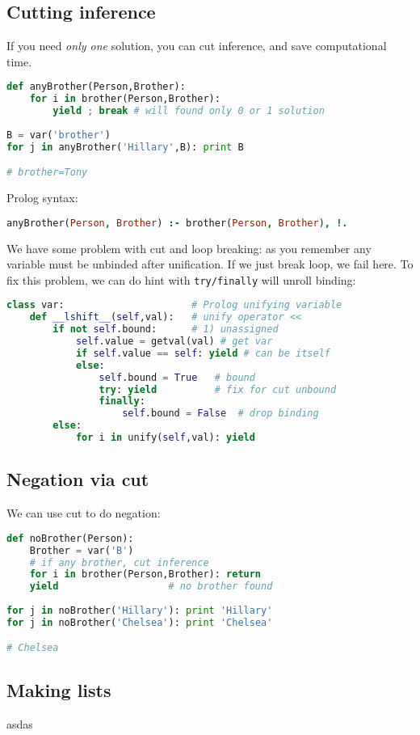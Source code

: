 \subsection{Cutting inference}

If you need \emph{only one} solution, you can cut inference, and save
computational time.

\begin{lstlisting}[language=Python]
def anyBrother(Person,Brother):
	for i in brother(Person,Brother):
		yield ; break # will found only 0 or 1 solution
	
B = var('brother')
for j in anyBrother('Hillary',B): print B

# brother=Tony
\end{lstlisting}
Prolog syntax:
\begin{lstlisting}[language=Prolog]
anyBrother(Person, Brother) :- brother(Person, Brother), !.
\end{lstlisting}

We have some problem with cut and loop breaking: as you remember any variable
must be unbinded after unification. If we just break loop, we fail here. To fix
this problem, we can do hint with \verb|try/finally| will unroll binding:
\begin{lstlisting}[language=Python]
class var:						# Prolog unifying variable
	def __lshift__(self,val):   # unify operator <<
		if not self.bound:		# 1) unassigned
			self.value = getval(val) # get var
			if self.value == self: yield # can be itself
			else:
				self.bound = True	# bound
				try: yield			# fix for cut unbound
				finally:
					self.bound = False	# drop binding
		else:
			for i in unify(self,val): yield
\end{lstlisting}


\clearpage
\subsection{Negation via cut}

We can use cut to do negation:
\begin{lstlisting}[language=Python]
def noBrother(Person):
	Brother = var('B')
	# if any brother, cut inference
	for i in brother(Person,Brother): return 
	yield					# no brother found							  
	
for j in noBrother('Hillary'): print 'Hillary'
for j in noBrother('Chelsea'): print 'Chelsea'

# Chelsea
\end{lstlisting}

\clearpage
\subsection{Making lists}

asdas